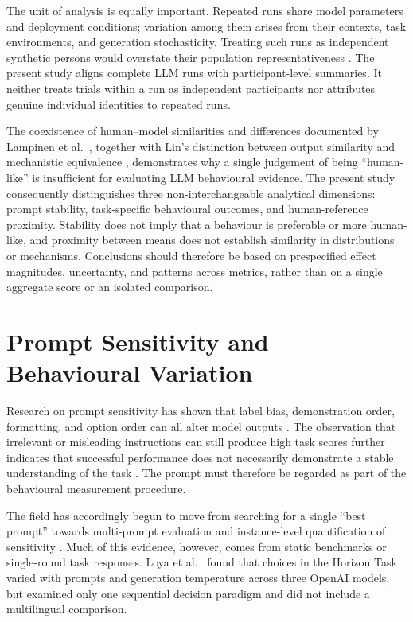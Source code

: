 \documentclass[logo,msc]{infthesis}
\begin{document}
The unit of analysis is equally important. Repeated runs share model parameters and deployment conditions; variation among them arises from their contexts, task environments, and generation stochasticity. Treating such runs as independent synthetic persons would overstate their population representativeness \cite{Dillion2023ReplaceParticipants,Bisbee2024SyntheticSurveyData}. The present study aligns complete LLM runs with participant-level summaries. It neither treats trials within a run as independent participants nor attributes genuine individual identities to repeated runs.

The coexistence of human--model similarities and differences documented by Lampinen et al.~\cite{Lampinen2024ContentEffects}, together with Lin's distinction between output similarity and mechanistic equivalence \cite{Lin2025SixFallacies}, demonstrates why a single judgement of being ``human-like'' is insufficient for evaluating LLM behavioural evidence. The present study consequently distinguishes three non-interchangeable analytical dimensions: prompt stability, task-specific behavioural outcomes, and human-reference proximity. Stability does not imply that a behaviour is preferable or more human-like, and proximity between means does not establish similarity in distributions or mechanisms. Conclusions should therefore be based on prespecified effect magnitudes, uncertainty, and patterns across metrics, rather than on a single aggregate score or an isolated comparison.

\section{Prompt Sensitivity and Behavioural Variation}

Research on prompt sensitivity has shown that label bias, demonstration order, formatting, and option order can all alter model outputs \cite{Zhao2021Calibrate,Lu2022PromptOrder,Sclar2024PromptFormatting,Pezeshkpour2024OptionOrder}. The observation that irrelevant or misleading instructions can still produce high task scores further indicates that successful performance does not necessarily demonstrate a stable understanding of the task \cite{Webson2022PromptMeaning}. The prompt must therefore be regarded as part of the behavioural measurement procedure.

The field has accordingly begun to move from searching for a single ``best prompt'' towards multi-prompt evaluation and instance-level quantification of sensitivity \cite{Mizrahi2024MultiPrompt,Zhuo2024ProSA}. Much of this evidence, however, comes from static benchmarks or single-round task responses. Loya et al.~\cite{Loya2023PromptSensitivityDecision} found that choices in the Horizon Task varied with prompts and generation temperature across three OpenAI models, but examined only one sequential decision paradigm and did not include a multilingual comparison.
\end{document}
